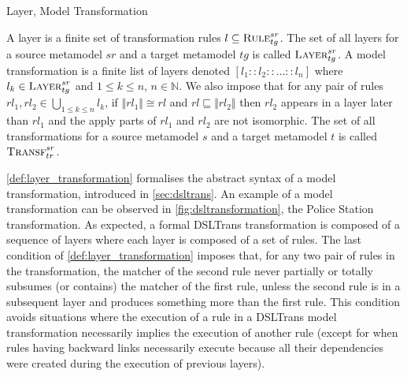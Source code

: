 \begin{definition}{Layer, Model Transformation\\}
\label{def:layer_transformation}

A layer is a finite set of transformation rules $l\subseteq \textsc{Rule}^{sr}_{tg}$. The set of all layers for a source metamodel $sr$ and a target metamodel $tg$  is called $\textsc{Layer}^{sr}_{tg}$. A model transformation is a finite list of layers denoted $[l_{1}::l_{2}::\ldots::l_{n}]$ where $l_{k}\in \textsc{Layer}^{sr}_{tg}$ and $1\leq k \leq n$, $n\in \mathbb{N}$. We also impose that for any pair of rules $rl_1,rl_2\in \bigcup_{1\leq k\leq n}l_k$, if $\Vert rl_1\Vert \cong rl$ and $rl\sqsubseteq \Vert rl_2\Vert $ then $rl_2$ appears in a layer later than $rl_1$ and the apply parts of $rl_1$ and $rl_2$ are not isomorphic. The set of all transformations for a source metamodel $s$ and a target metamodel $t$ is called $\textsc{Transf}^{sr}_{tr}$. 


\end{definition}





\cref{def:layer_transformation} formalises the abstract syntax of a model transformation, introduced in \cref{sec:dsltrans}. An example of a model transformation can be observed in \cref{fig:dsltransformation}, the Police Station transformation. As expected, a formal DSLTrans transformation is composed of a sequence of layers where each layer is composed of a set of rules. The last condition of \cref{def:layer_transformation} imposes that, for any two pair of rules in the transformation, the matcher of the second rule never partially or totally subsumes (or contains) the matcher of the first rule, unless the second rule is in a subsequent layer and produces something more than the first rule. This condition avoids situations where the execution of a rule in a DSLTrans model transformation necessarily implies the execution of another rule (except for when rules having backward links necessarily execute because all their dependencies were created during the execution of previous layers). 

